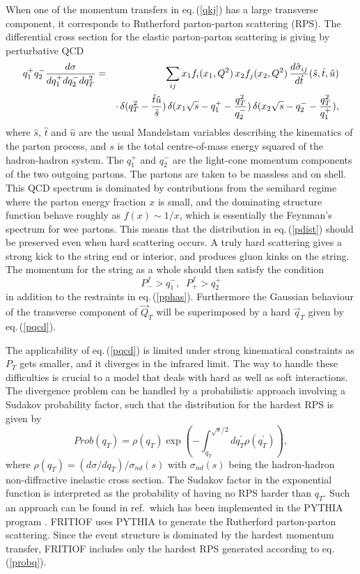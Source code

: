 When one of the momentum transfers
in eq.\,(\ref{qkj}) has a large transverse component, it corresponds to
Rutherford parton-parton scattering (RPS).  
The differential cross section for
the elastic parton-parton scattering is giving by perturbative QCD 
\begin{eqnarray}
\label{pqcd}
q_1^+q_2^- {{d\sigma}\over{dq_1^+dq_2^-dq_T^2}} &=&
\sum_{ij} x_1f_i(x_1,Q^2)\, x_2f_j(x_2,Q^2) 
\,{d\hat\sigma_{ij}\over d\hat t}(\hat s,\hat t,\hat u) \nonumber \\
& &\cdot\, \delta(q_T^2-{\hat t\hat u\over\hat s}) 
\,\delta(x_1\sqrt{s}-q_1^+-{q_T^2\over q_2^-})
\,\delta(x_2\sqrt{s}-q_2^--{q_T^2\over q_1^+}),
\end{eqnarray}
where 
$\hat s$, $\hat t$ and $\hat u$ are the usual Mandelstam variables describing
the kinematics of the parton process, and $s$ is the total centre-of-mass
energy squared of the hadron-hadron system.  
The $q_1^+$ and $q_2^-$ are the light-cone momentum components of the two outgoing partons.  The partons are taken to be massless and on shell.
This QCD spectrum is dominated
by contributions from the semihard regime where the parton energy fraction 
$x$ is small, and the dominating structure function behave roughly as
$f(x)\sim 1/x$, which is essentially the Feynman's spectrum for wee partons.
This means that the distribution in eq.\,(\ref{pdist}) should be preserved 
even when hard scattering occurs.  A truly hard scattering gives a strong
kick to the string end or interior, and produces gluon kinks on the string.
The momentum for the string as a whole should then satisfy the condition 
\begin{equation}
\label{pphasq}
P_-^f  > q_1^-, \;\;
P_+^f  > q_2^+
\end{equation}
in addition to the restraints in eq.\,(\ref{pphas}).
Furthermore 
the Gaussian behaviour of the transverse component of $\vec{Q}_T$ will be superimposed by a hard $\vec{q}_T$ given by eq.\,(\ref{pqcd}).

The applicability of eq.\,(\ref{pqcd}) is limited under strong kinematical
constraints as $P_T$ gets smaller, and it diverges in the infrared limit.
The way to handle these difficulties is crucial to a model that deals with
hard as well as soft interactions.  The divergence problem can be handled
by a probabilistic approach involving a Sudakov probability factor,
such that the distribution for the hardest RPS is given by
\begin{equation}
\label{probq}
Prob(q_T) = \rho(q_T) \exp\left(-\int_{q_T}^{\sqrt{s}/2} dq_T^\prime 
 \rho(q_T^\prime ) \right),
\end{equation}
where $\rho(q_T) = (d\sigma/{dq_T})/\sigma_{nd}(s)$ with $\sigma_{nd}(s)$
being the hadron-hadron non-diffractive inelastic cross section.
The Sudakov factor in the exponential function is interpreted as 
the probability of having no RPS harder than $q_T$.  Such an approach
can be found in ref.\,\cite{multisj} which has been implemented in
the PYTHIA program \cite{pyth}.  FRITIOF uses PYTHIA to generate the
Rutherford parton-parton scattering.  Since the event structure is
dominated by the hardest momentum transfer, FRITIOF includes only
the hardest RPS generated according to eq.\,(\ref{probq}).     
 
